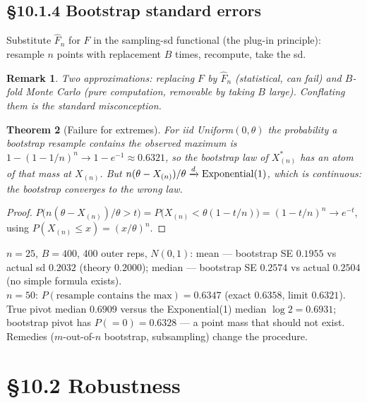 \documentclass[11pt]{article}
\newtheorem{theorem}{Theorem}[section]
\newtheorem{remark}[theorem]{Remark}
\begin{document}
\subsection{\S10.1.4 Bootstrap standard errors}
Substitute $\hat F_n$ for $F$ in the sampling-sd functional (the plug-in principle): resample $n$ points with replacement $B$ times, recompute, take the sd.
\begin{remark}
Two approximations: replacing $F$ by $\hat F_n$ (statistical, can fail) and $B$-fold Monte Carlo (pure computation, removable by taking $B$ large). Conflating them is the standard misconception.
\end{remark}
\begin{theorem}[Failure for extremes]
For iid Uniform$(0,\theta)$ the probability a bootstrap resample contains the observed maximum is $1-(1-1/n)^n\to1-e^{-1}\approx0.6321$, so the bootstrap law of $X^*_{(n)}$ has an atom of that mass at $X_{(n)}$. But $n(\theta-X_{(n)})/\theta\xrightarrow{d}\mathrm{Exponential}(1)$, which is continuous: the bootstrap converges to the wrong law.
\end{theorem}
\begin{proof}
$P\big(n(\theta-X_{(n)})/\theta>t\big)=P\big(X_{(n)}<\theta(1-t/n)\big)=(1-t/n)^n\to e^{-t}$, using $P(X_{(n)}\le x)=(x/\theta)^n$.
\end{proof}
\begin{simbox}
$n=25$, $B=400$, 400 outer reps, $N(0,1)$: mean --- bootstrap SE $0.1955$ vs actual sd $0.2032$ (theory $0.2000$); median --- bootstrap SE $0.2574$ vs actual $0.2504$ (no simple formula exists).\\
$n=50$: $P(\text{resample contains the max})=0.6347$ (exact $0.6358$, limit $0.6321$). True pivot median $0.6909$ versus the Exponential(1) median $\log2=0.6931$; bootstrap pivot has $P(=0)=0.6328$ --- a point mass that should not exist. Remedies ($m$-out-of-$n$ bootstrap, subsampling) change the procedure.
\end{simbox}

\section{\S10.2 Robustness}
\end{document}
